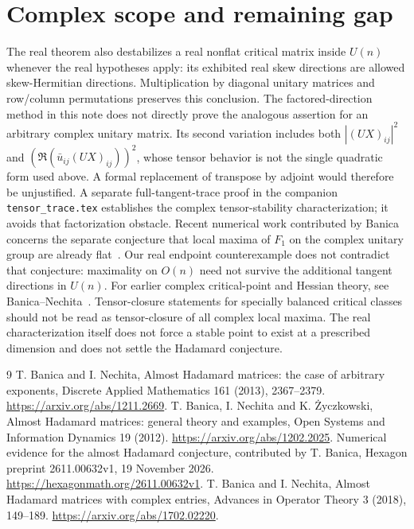 \documentclass[11pt]{article}
\begin{document}
\section*{Complex scope and remaining gap}
The real theorem also destabilizes a real nonflat critical matrix
inside $U(n)$ whenever the real hypotheses apply: its exhibited real
skew directions are allowed skew-Hermitian directions. Multiplication
by diagonal unitary matrices and row/column permutations preserves
this conclusion. The factored-direction method in this note does not
directly prove the analogous assertion for an arbitrary complex
unitary matrix. Its second variation includes both
$| (UX)_{ij}|^2$ and $(\Re(\bar u_{ij}(UX)_{ij}))^2$, whose tensor
behavior is not the single quadratic form used above. A formal
replacement of transpose by adjoint would therefore be unjustified.
A separate full-tangent-trace proof in the companion
\texttt{tensor\_trace.tex} establishes the complex tensor-stability
characterization; it avoids that factorization obstacle.
Recent numerical work contributed by Banica concerns the separate
conjecture that local maxima of $F_1$ on the complex unitary group are
already flat~\cite{Hexagon}. Our real endpoint counterexample does not
contradict that conjecture: maximality on $O(n)$ need not survive the
additional tangent directions in $U(n)$.
For earlier complex critical-point and Hessian theory, see
Banica--Nechita~\cite{Complex}. Tensor-closure statements for specially
balanced critical classes should not be read as tensor-closure of all
complex local maxima.
The real characterization itself does not force a stable point to
exist at a prescribed dimension and does not settle the Hadamard
conjecture.

\begin{thebibliography}{9}
 T. Banica and I. Nechita, Almost Hadamard matrices:
the case of arbitrary exponents, Discrete Applied Mathematics 161
(2013), 2367--2379. \url{https://arxiv.org/abs/1211.2669}.
 T. Banica, I. Nechita and K. \.{Z}yczkowski,
Almost Hadamard matrices: general theory and examples,
Open Systems and Information Dynamics 19 (2012).
\url{https://arxiv.org/abs/1202.2025}.
 Numerical evidence for the almost Hadamard conjecture,
contributed by T. Banica, Hexagon preprint 2611.00632v1,
19 November 2026. \url{https://hexagonmath.org/2611.00632v1}.
 T. Banica and I. Nechita, Almost Hadamard matrices
with complex entries, Advances in Operator Theory 3 (2018), 149--189.
\url{https://arxiv.org/abs/1702.02220}.
\end{thebibliography}
\end{document}
